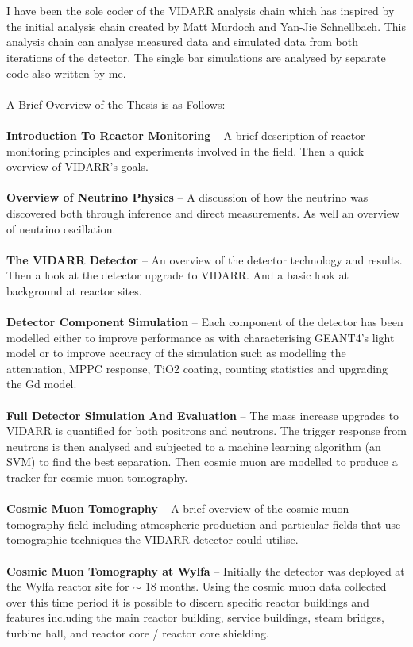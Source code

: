 \\\\I have been the sole coder of the VIDARR analysis chain which has inspired by the initial analysis chain created by Matt Murdoch and Yan-Jie Schnellbach. This analysis chain can analyse measured data and simulated data from both iterations of the detector. The single bar simulations are analysed by separate code also written by me. 
\\\\A Brief Overview of the Thesis is as Follows:
\\\\\textbf{Introduction To Reactor Monitoring} -- A brief description of reactor monitoring principles and experiments involved in the field. Then a quick overview of VIDARR's goals.  
\\\\\textbf{Overview of Neutrino Physics} -- A discussion of how the neutrino was discovered both through inference and direct measurements. As well an overview of neutrino oscillation.
\\\\\textbf{The VIDARR Detector} -- An overview of the detector technology and results. Then a look at the detector upgrade to VIDARR. And a basic look at background at reactor sites.
\\\\\textbf{Detector Component Simulation} -- Each component of the detector has been modelled either to improve performance as with characterising GEANT4's light model or to improve accuracy of the simulation such as modelling the attenuation, MPPC response, TiO2 coating, counting statistics and upgrading the Gd model. 
\\\\\textbf{Full Detector Simulation And Evaluation} -- The mass increase upgrades to VIDARR is quantified for both positrons and neutrons. The trigger response from neutrons is then analysed and subjected to a machine learning algorithm (an SVM) to find the best separation. Then cosmic muon are modelled to produce a tracker for cosmic muon tomography.
\\\\\textbf{Cosmic Muon Tomography} -- A brief overview of the cosmic muon tomography field including atmospheric production and particular fields that use tomographic techniques the VIDARR detector could utilise. 
\\\\\textbf{Cosmic Muon Tomography at Wylfa} -- Initially the detector was deployed at the Wylfa reactor site for $\sim$ 18 months. Using the cosmic muon data collected over this time period it is possible to discern specific reactor buildings and features including the main reactor building, service buildings, steam bridges, turbine hall, and reactor core / reactor core shielding.